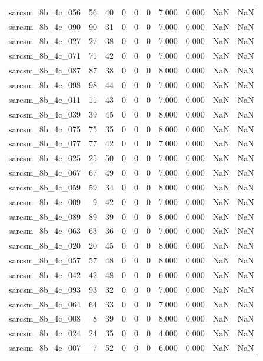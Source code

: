 \documentclass{article}
\begin{document}
\begin{longtable}{lrrrrrrrrr}
sarcsm\_8b\_4c\_056 & 56 & 40 & 0 & 0 & 0 & 7.000 & 0.000 & NaN & NaN \\
sarcsm\_8b\_4c\_090 & 90 & 31 & 0 & 0 & 0 & 7.000 & 0.000 & NaN & NaN \\
sarcsm\_8b\_4c\_027 & 27 & 38 & 0 & 0 & 0 & 7.000 & 0.000 & NaN & NaN \\
sarcsm\_8b\_4c\_071 & 71 & 42 & 0 & 0 & 0 & 7.000 & 0.000 & NaN & NaN \\
sarcsm\_8b\_4c\_087 & 87 & 38 & 0 & 0 & 0 & 8.000 & 0.000 & NaN & NaN \\
sarcsm\_8b\_4c\_098 & 98 & 44 & 0 & 0 & 0 & 7.000 & 0.000 & NaN & NaN \\
sarcsm\_8b\_4c\_011 & 11 & 43 & 0 & 0 & 0 & 7.000 & 0.000 & NaN & NaN \\
sarcsm\_8b\_4c\_039 & 39 & 45 & 0 & 0 & 0 & 8.000 & 0.000 & NaN & NaN \\
sarcsm\_8b\_4c\_075 & 75 & 35 & 0 & 0 & 0 & 8.000 & 0.000 & NaN & NaN \\
sarcsm\_8b\_4c\_077 & 77 & 42 & 0 & 0 & 0 & 7.000 & 0.000 & NaN & NaN \\
sarcsm\_8b\_4c\_025 & 25 & 50 & 0 & 0 & 0 & 7.000 & 0.000 & NaN & NaN \\
sarcsm\_8b\_4c\_067 & 67 & 49 & 0 & 0 & 0 & 7.000 & 0.000 & NaN & NaN \\
sarcsm\_8b\_4c\_059 & 59 & 34 & 0 & 0 & 0 & 8.000 & 0.000 & NaN & NaN \\
sarcsm\_8b\_4c\_009 & 9 & 42 & 0 & 0 & 0 & 7.000 & 0.000 & NaN & NaN \\
sarcsm\_8b\_4c\_089 & 89 & 39 & 0 & 0 & 0 & 8.000 & 0.000 & NaN & NaN \\
sarcsm\_8b\_4c\_063 & 63 & 36 & 0 & 0 & 0 & 7.000 & 0.000 & NaN & NaN \\
sarcsm\_8b\_4c\_020 & 20 & 45 & 0 & 0 & 0 & 8.000 & 0.000 & NaN & NaN \\
sarcsm\_8b\_4c\_057 & 57 & 48 & 0 & 0 & 0 & 8.000 & 0.000 & NaN & NaN \\
sarcsm\_8b\_4c\_042 & 42 & 48 & 0 & 0 & 0 & 6.000 & 0.000 & NaN & NaN \\
sarcsm\_8b\_4c\_093 & 93 & 32 & 0 & 0 & 0 & 7.000 & 0.000 & NaN & NaN \\
sarcsm\_8b\_4c\_064 & 64 & 33 & 0 & 0 & 0 & 7.000 & 0.000 & NaN & NaN \\
sarcsm\_8b\_4c\_008 & 8 & 39 & 0 & 0 & 0 & 8.000 & 0.000 & NaN & NaN \\
sarcsm\_8b\_4c\_024 & 24 & 35 & 0 & 0 & 0 & 4.000 & 0.000 & NaN & NaN \\
sarcsm\_8b\_4c\_007 & 7 & 52 & 0 & 0 & 0 & 6.000 & 0.000 & NaN & NaN \\

\end{longtable}
\end{document}
